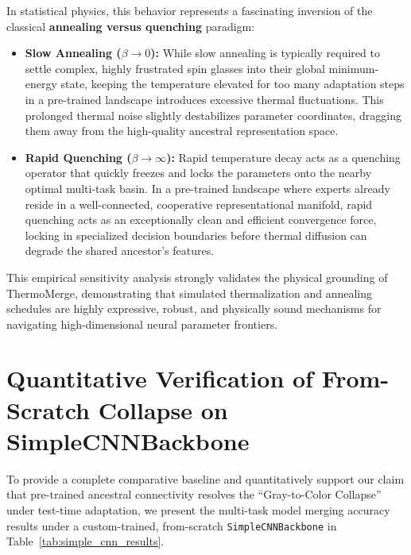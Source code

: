 \documentclass{article}
\theoremstyle{plain}
\theoremstyle{definition}
\theoremstyle{remark}
\begin{document}
In statistical physics, this behavior represents a fascinating inversion of the classical \textbf{annealing versus quenching} paradigm:
\begin{itemize}
    \item \textbf{Slow Annealing ($\beta \to 0$):} While slow annealing is typically required to settle complex, highly frustrated spin glasses into their global minimum-energy state, keeping the temperature elevated for too many adaptation steps in a pre-trained landscape introduces excessive thermal fluctuations. This prolonged thermal noise slightly destabilizes parameter coordinates, dragging them away from the high-quality ancestral representation space.
    \item \textbf{Rapid Quenching ($\beta \to \infty$):} Rapid temperature decay acts as a quenching operator that quickly freezes and locks the parameters onto the nearby optimal multi-task basin. In a pre-trained landscape where experts already reside in a well-connected, cooperative representational manifold, rapid quenching acts as an exceptionally clean and efficient convergence force, locking in specialized decision boundaries before thermal diffusion can degrade the shared ancestor's features.
\end{itemize}
This empirical sensitivity analysis strongly validates the physical grounding of ThermoMerge, demonstrating that simulated thermalization and annealing schedules are highly expressive, robust, and physically sound mechanisms for navigating high-dimensional neural parameter frontiers.

\section{Quantitative Verification of From-Scratch Collapse on SimpleCNNBackbone}
\label{sec:simple_cnn_results}

To provide a complete comparative baseline and quantitatively support our claim that pre-trained ancestral connectivity resolves the ``Gray-to-Color Collapse'' under test-time adaptation, we present the multi-task model merging accuracy results under a custom-trained, from-scratch \texttt{SimpleCNNBackbone} in Table~\ref{tab:simple_cnn_results}.
\end{document}
